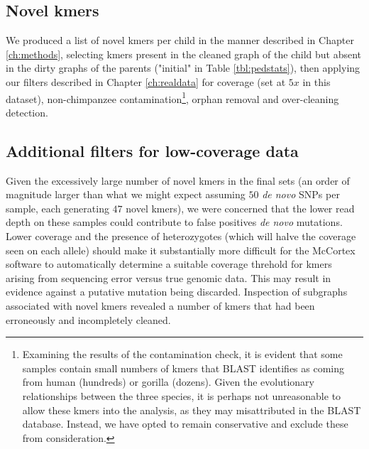 \subsection{Novel kmers}

We produced a list of novel kmers per child in the manner described in Chapter \ref{ch:methods}, selecting kmers present in the cleaned graph of the child but absent in the dirty graphs of the parents ("initial" in Table \ref{tbl:pedstats}), then applying our filters described in Chapter \ref{ch:realdata} for coverage (set at $5x$ in this dataset), non-chimpanzee contamination\footnote{Examining the results of the contamination check, it is evident that some samples contain small numbers of kmers that BLAST identifies as coming from human (hundreds) or gorilla (dozens).  Given the evolutionary relationships between the three species, it is perhaps not unreasonable to allow these kmers into the analysis, as they may misattributed in the BLAST database.  Instead, we have opted to remain conservative and exclude these from consideration.}, orphan removal and over-cleaning detection.

\subsection{Additional filters for low-coverage data}

Given the excessively large number of novel kmers in the final sets (an order of magnitude larger than what we might expect assuming $50$ \textit{de novo} SNPs per sample, each generating $47$ novel kmers), we were concerned that the lower read depth on these samples could contribute to false positives \textit{de novo} mutations.  Lower coverage and the presence of heterozygotes (which will halve the coverage seen on each allele) should make it substantially more difficult for the McCortex software to automatically determine a suitable coverage threhold for kmers arising from sequencing error versus true genomic data.  This may result in evidence against a putative mutation being discarded.  Inspection of subgraphs associated with novel kmers revealed a number of kmers that had been erroneously and incompletely cleaned.

